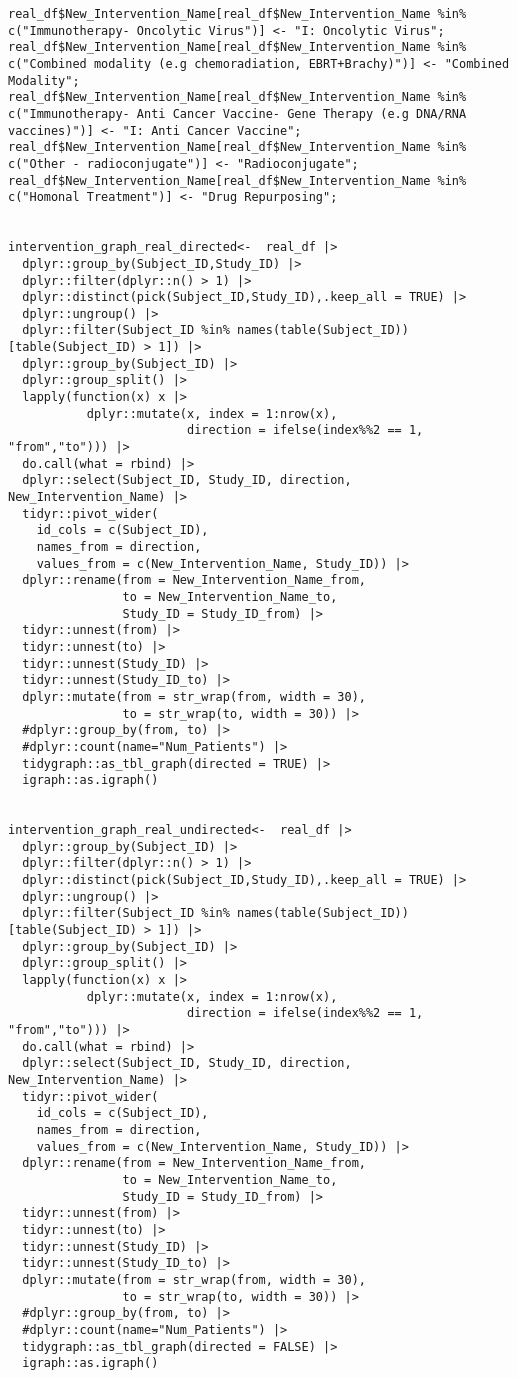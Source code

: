 \begin{verbatim}
real_df$New_Intervention_Name[real_df$New_Intervention_Name %in% c("Immunotherapy- Oncolytic Virus")] <- "I: Oncolytic Virus";
real_df$New_Intervention_Name[real_df$New_Intervention_Name %in% c("Combined modality (e.g chemoradiation, EBRT+Brachy)")] <- "Combined Modality";
real_df$New_Intervention_Name[real_df$New_Intervention_Name %in% c("Immunotherapy- Anti Cancer Vaccine- Gene Therapy (e.g DNA/RNA vaccines)")] <- "I: Anti Cancer Vaccine";
real_df$New_Intervention_Name[real_df$New_Intervention_Name %in% c("Other - radioconjugate")] <- "Radioconjugate";
real_df$New_Intervention_Name[real_df$New_Intervention_Name %in% c("Homonal Treatment")] <- "Drug Repurposing";


intervention_graph_real_directed<-  real_df |>
  dplyr::group_by(Subject_ID,Study_ID) |>
  dplyr::filter(dplyr::n() > 1) |>
  dplyr::distinct(pick(Subject_ID,Study_ID),.keep_all = TRUE) |>
  dplyr::ungroup() |>
  dplyr::filter(Subject_ID %in% names(table(Subject_ID))[table(Subject_ID) > 1]) |>
  dplyr::group_by(Subject_ID) |>
  dplyr::group_split() |>
  lapply(function(x) x |>
           dplyr::mutate(x, index = 1:nrow(x),
                         direction = ifelse(index%%2 == 1, "from","to"))) |>
  do.call(what = rbind) |>
  dplyr::select(Subject_ID, Study_ID, direction, New_Intervention_Name) |>
  tidyr::pivot_wider(
    id_cols = c(Subject_ID),
    names_from = direction,
    values_from = c(New_Intervention_Name, Study_ID)) |>
  dplyr::rename(from = New_Intervention_Name_from,
                to = New_Intervention_Name_to,
                Study_ID = Study_ID_from) |>
  tidyr::unnest(from) |>
  tidyr::unnest(to) |>
  tidyr::unnest(Study_ID) |>
  tidyr::unnest(Study_ID_to) |>
  dplyr::mutate(from = str_wrap(from, width = 30),
                to = str_wrap(to, width = 30)) |>
  #dplyr::group_by(from, to) |>
  #dplyr::count(name="Num_Patients") |>
  tidygraph::as_tbl_graph(directed = TRUE) |>
  igraph::as.igraph()


intervention_graph_real_undirected<-  real_df |>
  dplyr::group_by(Subject_ID) |>
  dplyr::filter(dplyr::n() > 1) |>
  dplyr::distinct(pick(Subject_ID,Study_ID),.keep_all = TRUE) |>
  dplyr::ungroup() |>
  dplyr::filter(Subject_ID %in% names(table(Subject_ID))[table(Subject_ID) > 1]) |>
  dplyr::group_by(Subject_ID) |>
  dplyr::group_split() |>
  lapply(function(x) x |>
           dplyr::mutate(x, index = 1:nrow(x),
                         direction = ifelse(index%%2 == 1, "from","to"))) |>
  do.call(what = rbind) |>
  dplyr::select(Subject_ID, Study_ID, direction, New_Intervention_Name) |>
  tidyr::pivot_wider(
    id_cols = c(Subject_ID),
    names_from = direction,
    values_from = c(New_Intervention_Name, Study_ID)) |>
  dplyr::rename(from = New_Intervention_Name_from,
                to = New_Intervention_Name_to,
                Study_ID = Study_ID_from) |>
  tidyr::unnest(from) |>
  tidyr::unnest(to) |>
  tidyr::unnest(Study_ID) |>
  tidyr::unnest(Study_ID_to) |>
  dplyr::mutate(from = str_wrap(from, width = 30),
                to = str_wrap(to, width = 30)) |>
  #dplyr::group_by(from, to) |>
  #dplyr::count(name="Num_Patients") |>
  tidygraph::as_tbl_graph(directed = FALSE) |>
  igraph::as.igraph()



\end{verbatim}
